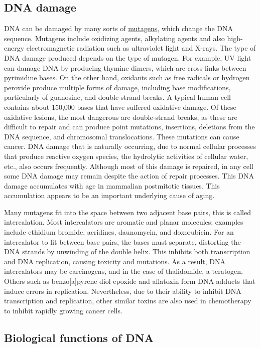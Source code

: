 \hypertarget{dna-damage}{%
\subsection{DNA damage}\label{dna-damage}}

DNA can be damaged by many sorts of \href{https://en.wikipedia.org/wiki/Mutagen}{mutagens}, which change the DNA sequence. Mutagens include oxidizing agents, alkylating agents and also high-energy electromagnetic radiation such as ultraviolet light and X-rays. The type of DNA damage produced depends on the type of mutagen. For example, UV light can damage DNA by producing thymine dimers, which are cross-links between pyrimidine bases. On the other hand, oxidants such as free radicals or hydrogen peroxide produce multiple forms of damage, including base modifications, particularly of guanosine, and double-strand breaks. A typical human cell contains about 150,000 bases that have suffered oxidative damage. Of these oxidative lesions, the most dangerous are double-strand breaks, as these are difficult to repair and can produce point mutations, insertions, deletions from the DNA sequence, and chromosomal translocations. These mutations can cause cancer. DNA damage that is naturally occurring, due to normal cellular processes that produce reactive oxygen species, the hydrolytic activities of cellular water, etc., also occurs frequently. Although most of this damage is repaired, in any cell some DNA damage may remain despite the action of repair processes. This DNA damage accumulates with age in mammalian postmitotic tissues. This accumulation appears to be an important underlying cause of aging.

Many mutagens fit into the space between two adjacent base pairs, this is called intercalation. Most intercalators are aromatic and planar molecules; examples include ethidium bromide, acridines, daunomycin, and doxorubicin. For an intercalator to fit between base pairs, the bases must separate, distorting the DNA strands by unwinding of the double helix. This inhibits both transcription and DNA replication, causing toxicity and mutations. As a result, DNA intercalators may be carcinogens, and in the case of thalidomide, a teratogen. Others such as benzo{[}a{]}pyrene diol epoxide and aflatoxin form DNA adducts that induce errors in replication. Nevertheless, due to their ability to inhibit DNA transcription and replication, other similar toxins are also used in chemotherapy to inhibit rapidly growing cancer cells.

\hypertarget{biological-functions-of-dna}{%
\subsection{Biological functions of DNA}\label{biological-functions-of-dna}}

